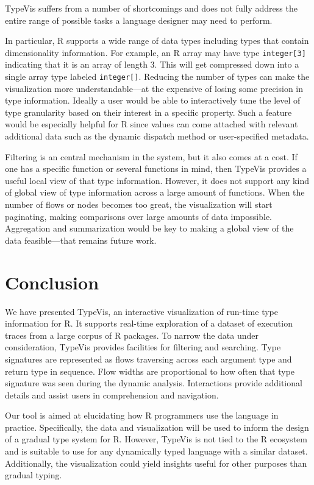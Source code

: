 \documentclass{vgtc}                          %
\newcommand{\typevis}{{\sc TypeVis}\xspace}
\begin{document}
\typevis suffers from a number of shortcomings
and does not fully address the entire range of possible tasks
a language designer may need to perform.

In particular, R supports a wide range of data types
including types that contain dimensionality information.
For example, an R array may have type {\tt integer[3]}
indicating that it is an array of length $3$.
This will get compressed down into a single array
type labeled {\tt integer[]}.
Reducing the number of types can make the visualization
more understandable---at the expensive of losing some
precision in type information.
Ideally a user would be able to interactively tune
the level of type granularity based on their interest
in a specific property.
Such a feature would be especially helpful for R
since values can come attached with relevant additional
data such as the dynamic dispatch method
or user-specified metadata.

Filtering is an central mechanism in the system,
but it also comes at a cost.
If one has a specific function or several functions
in mind, then \typevis provides a useful
local view of that type information.
However, it does not support any kind of global
view of type information across a large amount of
functions. When the number of flows or nodes
becomes too great, the visualization will start
paginating, making comparisons over large amounts
of data impossible.
Aggregation and summarization would be key to
making a global view of the data feasible---that
remains future work.


\section{Conclusion}

We have presented \typevis, an interactive visualization
of run-time type information for R.
It supports real-time exploration of a dataset of
execution traces from a large corpus of R packages.
To narrow the data under consideration,
\typevis provides facilities for filtering
and searching.
Type signatures are represented as flows traversing across
each argument type and return type in sequence.
Flow widths are proportional to how often
that type signature was seen during the dynamic analysis.
Interactions provide additional details and
assist users in comprehension and navigation.

Our tool is aimed at elucidating how R programmers
use the language in practice.
Specifically, the data and visualization will be used to
inform the design of a gradual type system for R.
However, \typevis is not tied to the R ecosystem
and is suitable to use for any dynamically typed language
with a similar dataset.
Additionally, the visualization could yield insights
useful for other purposes than gradual typing.
\end{document}
